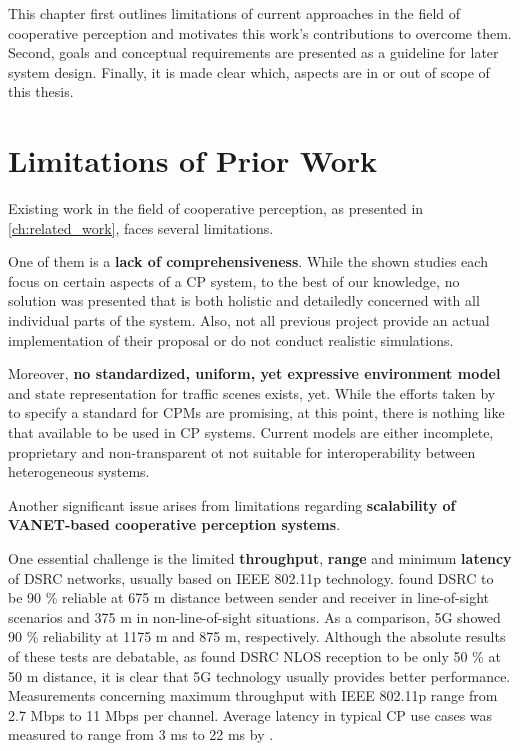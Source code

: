 This chapter first outlines limitations of current approaches in the field of cooperative perception and motivates this work's contributions to overcome them. Second, goals and conceptual requirements are presented as a guideline for later system design. Finally, it is made clear which, aspects are in or out of scope of this thesis.

\section{Limitations of Prior Work}
\label{sec:problem_analysis:limitations_of_prior_work}

Existing work in the field of cooperative perception, as presented in \autoref{ch:related_work}, faces several limitations.
\par
\bigskip

One of them is a \textbf{lack of comprehensiveness}. While the shown studies each focus on certain aspects of a CP system, to the best of our knowledge, no solution was presented that is both holistic and detailedly concerned with all individual parts of the system. Also, not all previous project provide an actual implementation of their proposal or do not conduct realistic simulations.
\par
\bigskip

Moreover, \textbf{no standardized, uniform, yet expressive environment model} and state representation for traffic scenes exists, yet. While the efforts taken by \cite{EuropeanTelecommunicationsStandardsInstituteETSI2019} to specify a standard for CPMs are promising, at this point, there is nothing like that available to be used in CP systems. Current models are either incomplete, proprietary and non-transparent ot not suitable for interoperability between heterogeneous systems. 
\par
\bigskip

Another significant issue arises from limitations regarding \textbf{scalability of VANET-based cooperative perception systems}.

One essential challenge is the limited \textbf{throughput}, \textbf{range} and minimum \textbf{latency} of DSRC networks, usually based on IEEE 802.11p technology. \cite{5GAutomotiveAssociation2018} found DSRC to be 90 \% reliable at 675 m distance between sender and receiver in line-of-sight scenarios and 375 m in non-line-of-sight situations. As a comparison, 5G showed 90 \% reliability at 1175 m and 875 m, respectively. Although the absolute results of these tests are debatable, as \cite{Mangel2011} found DSRC NLOS reception to be only 50 \% at 50 m distance, it is clear that 5G technology usually provides better performance. Measurements concerning maximum throughput with IEEE 802.11p range from 2.7 Mbps to 11 Mbps per channel. Average latency in typical CP use cases was measured to range from 3 ms to 22 ms by \cite{Rauch2011}.

